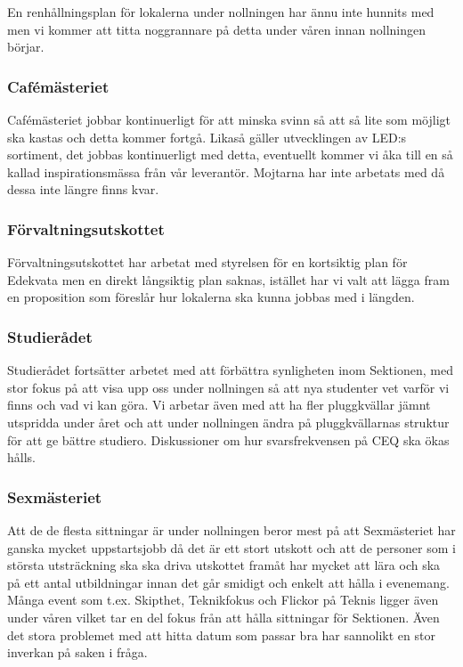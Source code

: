 \documentclass[../_main/handlingar.tex]{subfiles}
\begin{document}
En renhållningsplan för lokalerna under nollningen har ännu inte hunnits med men vi kommer att titta noggrannare på detta under våren innan nollningen börjar.

\subsubsection*{Cafémästeriet}
Cafémästeriet jobbar kontinuerligt för att minska svinn så att så lite som möjligt ska kastas och detta kommer fortgå. Likaså gäller utvecklingen av LED:s sortiment, det jobbas kontinuerligt med detta, eventuellt kommer vi åka till en så kallad inspirationsmässa från vår leverantör. Mojtarna har inte arbetats med då dessa inte längre finns kvar.

\subsubsection*{Förvaltningsutskottet}
Förvaltningsutskottet har arbetat med styrelsen för en kortsiktig plan för Edekvata men en direkt långsiktig plan saknas, istället har vi valt att lägga fram en proposition som föreslår hur lokalerna ska kunna jobbas med i längden.

\subsubsection*{Studierådet}
Studierådet fortsätter arbetet med att förbättra synligheten inom Sektionen, med stor fokus på att visa upp oss under nollningen så att nya studenter vet varför vi finns och vad vi kan göra. Vi arbetar även med att ha fler pluggkvällar jämnt utspridda under året och att under nollningen ändra på pluggkvällarnas struktur för att ge bättre studiero. Diskussioner om hur svarsfrekvensen på CEQ ska ökas hålls.

\subsubsection*{Sexmästeriet}
Att de de flesta sittningar är under nollningen beror mest på att Sexmästeriet har ganska mycket uppstartsjobb då det är ett stort utskott och att de personer som i största utsträckning ska ska driva utskottet framåt har mycket att lära och ska på ett antal utbildningar innan det går smidigt och enkelt att hålla i evenemang. Många event som t.ex. Skipthet, Teknikfokus och Flickor på Teknis ligger även under våren vilket tar en del fokus från att hålla sittningar för Sektionen. Även det stora problemet med att hitta datum som passar bra har sannolikt en stor inverkan på saken i fråga.
\end{document}
